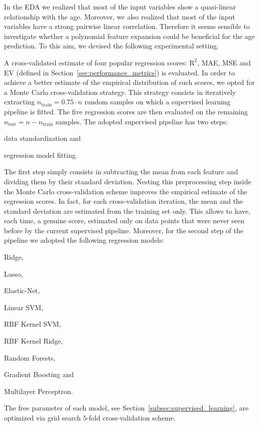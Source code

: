 In the EDA we realized that most of the input variables show a quasi-linear relationship with the age. Moreover, we also realized that most of the input variables have a strong pairwise linear correlation. Therefore it seems sensible to investigate whether a polynomial feature expansion could be beneficial for the age prediction.
To this aim, we devised the following experimental setting.

A cross-validated estimate of four popular regression scores: $\text{R}^2$, MAE, MSE and EV (defined in Section~\ref{sec:performance_metrics}) is evaluated.
In order to achieve a better estimate of the empirical distribution of such scores, we opted for a Monte Carlo cross-validation strategy.
This strategy consists in iteratively extracting $n_{\text{train}} = 0.75 \cdot n$ random samples on which a supervised learning pipeline is fitted.
The five regression scores are then evaluated on the remaining $n_{\text{test}} = n - n_{\text{train}}$ samples.
The adopted supervised pipeline has two steps:
\begin{enumerate*}[label=(\roman*)]
	\item data standardization and
	\item regression model fitting.
\end{enumerate*}
The first step simply consists in subtracting the mean from each feature and dividing them by their standard deviation. Nesting this preprocessing step inside the Monte Carlo cross-validation scheme improves the empirical estimate of the regression scores. In fact, for each cross-validation iteration, the mean and the standard deviation are estimated from the training set only. This allows to have, each time, a genuine score, estimated only on data points that were never seen before by the current supervised pipeline.
Moreover, for the second step of the pipeline we adopted the following regression models:
\begin{enumerate*}[label=(\alph*)]
	\item Ridge,
	\item Lasso,
	\item Elastic-Net,
	\item Linear SVM,
	\item RBF Kernel SVM,
	\item RBF Kernel Ridge,
	\item Random Forests,
	\item Gradient Boosting and
	\item Multilayer Perceptron.
\end{enumerate*}
The free parameter of each model, see Section~\ref{subsec:supervised_learning}, are optimized via grid search $5$-fold cross-validation scheme.

